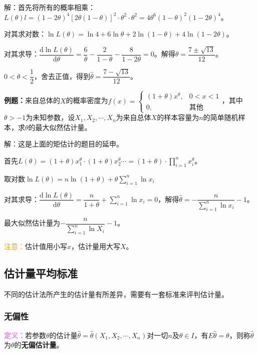 \documentclass[UTF8, 12pt]{ctexart}
\begin{document}
解：首先将所有的概率相乘：$L(\theta)l=(1-2\theta)^4[2\theta(1-\theta)]^2\cdot\theta^2\cdot\theta^2=4\theta^6(1-\theta)^2(1-2\theta)^4$。

对其求对数：$\ln L(\theta)=\ln4+6\ln\theta+2\ln(1-\theta)+4\ln(1-2\theta)$。

对其求导：$\dfrac{\textrm{d}\ln L(\theta)}{\textrm{d}\theta}=\dfrac{6}{\theta}-\dfrac{2}{1-\theta}-\dfrac{8}{1-2\theta}=0$。解得$\theta=\dfrac{7\pm\sqrt{13}}{12}$。

$0<\theta<\dfrac{1}{2}$，舍去正值，得到$\hat{\theta}=\dfrac{7-\sqrt{13}}{12}$。

\textbf{例题：}来自总体的$X$的概率密度为$f(x)=\left\{\begin{array}{ll}
    (1+\theta)x^\theta, & 0<x<1 \\
    0, & \text{其他}
\end{array}\right.$，其中$\theta>-1$为未知参数，设$X_1,X_2,\cdots,X_n$为来自总体$X$的样本容量为$n$的简单随机样本，求$\theta$的最大似然估计量。

解：这是上面的矩估计的题目的延申。

首先$L(\theta)=(1+\theta)x_1^\theta\cdot(1+\theta)x_2^\theta\cdots=(1+\theta)\cdot\prod\limits_{i=1}^nx_i^\theta$。

取对数$\ln L(\theta)=n\ln(1+\theta)+\theta\sum\limits_{i=1}^n\ln x_i$

对其求导：$\dfrac{\textrm{d}\ln L(\theta)}{\textrm{d}\theta}=\dfrac{n}{1+\theta}+\sum\limits_{i=1}^n\ln x_i=0$，解得$\hat{\theta}=-\dfrac{n}{\sum\limits_{i=1}^n\ln x_i}-1$。

最大似然估计量为$-\dfrac{n}{\sum\limits_{i=1}^n\ln X_i}-1$。

\textcolor{orange}{注意：}估计值用小写$x$，估计量用大写$X$。

\subsection{估计量平均标准}

不同的估计法所产生的估计量有所差异，需要有一套标准来评判估计量。

\subsubsection{无偏性}

\textcolor{violet}{\textbf{定义：}}若参数$\theta$的估计量$\hat{\theta}=\hat{\theta}(X_1,X_2,\cdots,X_n)$对一切$n$及$\theta\in I$，有$E\hat{\theta}=\theta$，则称$\hat{\theta}$为$\theta$的\textbf{无偏估计量}。
\end{document}
